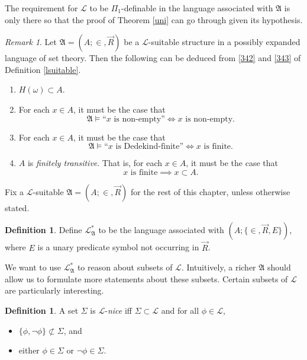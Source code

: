 \documentclass[12pt, twoside]{memoir}
\numberwithin{equation}{section}
\theoremstyle{definition}
\newtheorem{defi}[thm]{Definition}
\theoremstyle{remark}
\newtheorem{rem}[thm]{Remark}
\theoremstyle{definition}
\theoremstyle{definition}
\theoremstyle{definition}
\theoremstyle{remark}
\begin{document}
The requirement for $\mathcal{L}$ to be $\Pi_1$-definable in the language associated with $\mathfrak{A}$ is only there so that the proof of Theorem \ref{uni} can go through given its hypothesis.

\begin{rem}\label{rem35}
Let $\mathfrak{A} = (A; \in, \Vec{R})$ be a $\mathcal{L}$-suitable structure in a possibly expanded language of set theory. Then the following can be deduced from \ref{342} and \ref{343} of Definition \ref{lsuitable}.
\begin{enumerate}[label=(\arabic*)]
    \item\label{351} $H(\omega) \subset A$.
    \item\label{352} For each $x \in A$, it must be the case that
    \begin{equation*}
        \mathfrak{A} \models \text{``} x \text{ is non-empty''} \iff x \text{ is non-empty.}
    \end{equation*}
    \item\label{353} For each $x \in A$, it must be the case that
    \begin{equation*}
        \mathfrak{A} \models \text{``} x \text{ is Dedekind-finite''} \iff x \text{ is finite.}
    \end{equation*}
    \item\label{354} $A$ is \emph{finitely transitive}. That is, for each $x \in A$, it must be the case that
    \begin{equation*}
        x \text{ is finite} \implies x \subset A \text{.}
    \end{equation*}
\end{enumerate}
\end{rem}

Fix a $\mathcal{L}$-suitable $\mathfrak{A} = (A; \in, \Vec{R})$ for the rest of this chapter, unless otherwise stated.

\begin{defi}
Define $\mathcal{L}^{*}_{\mathfrak{A}}$ to be the language associated with $(A; \{\in, \Vec{R}, E\})$, where $E$ is a unary predicate symbol not occurring in $\Vec{R}$. 
\end{defi}

We want to use $\mathcal{L}^{*}_{\mathfrak{A}}$ to reason about subsets of $\mathcal{L}$. Intuitively, a richer $\mathfrak{A}$ should allow us to formulate more statements about these subsets. Certain subsets of $\mathcal{L}$ are particularly interesting.

\begin{defi}\label{lnice}
A set $\Sigma$ is $\mathcal{L}$-\emph{nice} iff $\Sigma \subset \mathcal{L}$ and for all $\phi \in \mathcal{L}$, 
\begin{itemize}
    \item $\{\phi, \neg \phi\} \not\subset \Sigma$, and
    \item either $\phi \in \Sigma$ or $\neg \phi \in \Sigma$.
\end{itemize}
\end{defi}
\end{document}
